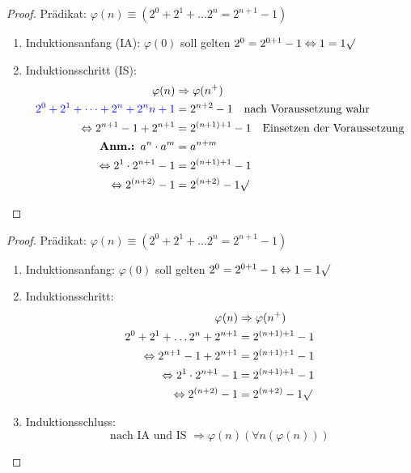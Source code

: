 \documentclass[12pt%
,aspectratio=169%
]{beamer}
\begin{document}
\begin{frame}
\begin{proof}
Prädikat: $\varphi(n) \equiv (2^0 + 2^1 + \dots 2^n = 2^{n+1}-1)$
\begin{enumerate}
	\item Induktionsanfang (IA): $\varphi(0)$ soll gelten
$2^0 = 2^{0+1}-1 \Leftrightarrow 1 = 1 \surd$\\
	\item Induktionsschritt (IS):
\begin{align*}
\varphi(n) & \Rightarrow \varphi(n^+)\\
\color{blue}{2^0 + 2^1 + \dots + 2^n} + 2^n{n+1} &= 2^{n+2} -1 \quad\text{nach Voraussetzung wahr}\\
\Leftrightarrow  2^{n+1} -1 + 2^{n+1} &= 2^{(n+1)+1}-1  \quad\text{Einsetzen der Voraussetzung}\\
\textbf{Anm.: } a^n \cdot a^m &= a^{n+m}\\
\Leftrightarrow  2^1 \cdot 2^{n+1} -1 &= 2^{(n+1)+1}-1\\
\Leftrightarrow  2^{(n+2)} -1 &= 2^{(n+2)}-1 \surd
\end{align*}
\end{enumerate}
\end{proof}
\end{frame}

\begin{frame}
\begin{proof}
Prädikat: $\varphi(n) \equiv (2^0 + 2^1 + \dots 2^n = 2^{n+1}-1)$
\begin{enumerate}
	\item Induktionsanfang: $\varphi(0)$ soll gelten
$2^0 = 2^{0+1}-1 \Leftrightarrow 1 = 1 \surd$\\
	\item Induktionsschritt:
\begin{align*}
\varphi(n) & \Rightarrow \varphi(n^+)\\
2^0 + 2^1 + \dots 2^n + 2^{n+1} &= 2^{(n+1)+1}-1\\
\Leftrightarrow  2^{n+1} -1 + 2^{n+1} &= 2^{(n+1)+1}-1 \\
\Leftrightarrow  2^1 \cdot 2^{n+1} -1 &= 2^{(n+1)+1}-1\\
\Leftrightarrow  2^{(n+2)} -1 &= 2^{(n+2)}-1 \surd
\end{align*}
	\item Induktionsschluss:
$$\text{nach IA und IS } \Rightarrow \varphi(n) (\forall n(\varphi(n)))$$
\end{enumerate}
\end{proof}
\end{frame}
\end{document}
